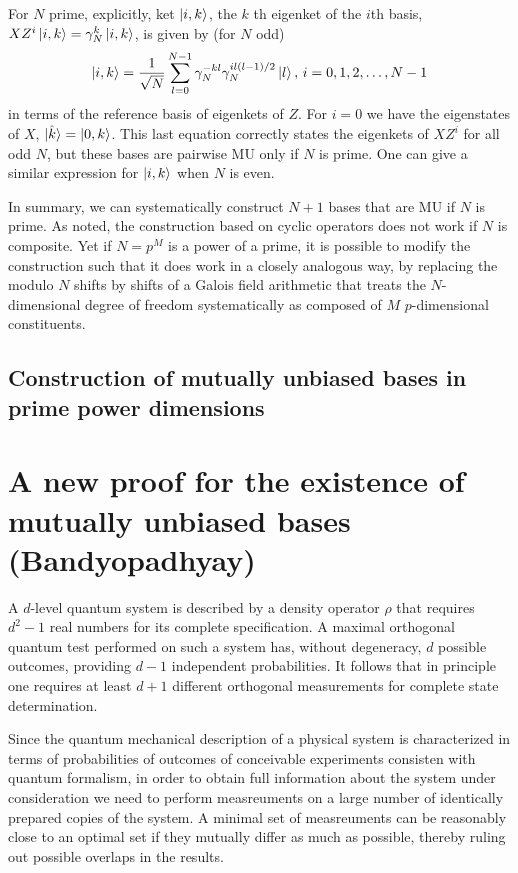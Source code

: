 \documentclass[a4paper]{article}
\begin{document}
  For $N$ prime, explicitly, ket $\ket{i,k}$, the $k$ th
  eigenket of the $i$th basis, $XZ^{i}\ket{i,k} =
  \gamma_N^{k}\ket{i,k}$, is given by (for $N$ odd)
  \[
    \ket{i,k}
    = \frac{1}{\sqrt{N}} \sum_{l=0}^{N-1} \gamma_N^{-kl}
    \gamma_N^{il(l-1) / 2} \ket l,
    \, i = 0,1,2,\ldots,N-1
  \] 
  in terms of the reference basis of eigenkets of $Z$. For
  $i = 0$ we have the eigenstates of $X$, $\ket{\hat{k}} =
  \ket{0,k}$. This last equation correctly states the
  eigenkets of $XZ^{i}$ for all odd $N$, but these bases are
  pairwise MU only if $N$ is prime. One can give a similar
  expression for $\ket{i,k}$ when $N$ is even.

  In summary, we can systematically construct $N+1$ bases
  that are MU if $N$ is prime. As noted, the construction
  based on cyclic operators does not work if $N$ is
  composite. Yet if $N = p^{M}$ is a power of a prime, it is
  possible to modify the construction such that it does work
  in a closely analogous way, by replacing the modulo $N$ 
  shifts by shifts of a Galois field arithmetic that treats
  the $N$-dimensional degree of freedom systematically as
  composed of $M$ $p$-dimensional constituents.

  \subsection{Construction of mutually unbiased bases in
  prime power dimensions}

  \section{A new proof for the existence of mutually
  unbiased bases (Bandyopadhyay)}

  A $d$-level quantum system is described by a density
  operator $\rho$ that requires $d^2-1$ real numbers for its
  complete specification. A maximal orthogonal quantum test
  performed on such a system has, without degeneracy, $d$ 
  possible outcomes, providing $d-1$ independent
  probabilities. It follows that in principle one requires
  at least $d+1$ different orthogonal measurements for
  complete state determination.

  Since the quantum mechanical description of a physical
  system is characterized in terms of probabilities of
  outcomes of conceivable experiments consisten with quantum
  formalism, in order to obtain full information about the
  system under consideration we need to perform measreuments
  on a large number of identically prepared copies of the
  system. A minimal set of measreuments can be reasonably
  close to an optimal set if they mutually differ as much as
  possible, thereby ruling out possible overlaps in the
  results.
\end{document}
